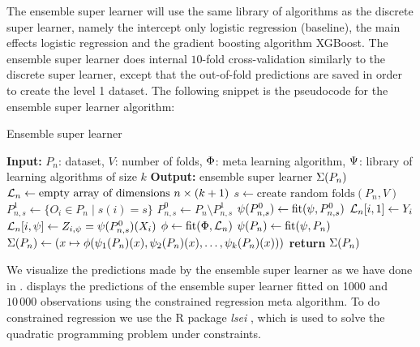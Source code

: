 \documentclass[./main.tex]{subfiles}
\begin{document}
The ensemble super learner will use the same library of algorithms as the discrete super learner, namely the intercept only logistic regression (baseline), the main effects logistic regression and the gradient boosting algorithm XGBoost. The ensemble super learner does internal $ 10 $-fold cross-validation similarly to the discrete super learner, except that the out-of-fold predictions are saved in order to create the level 1 dataset. The following snippet is the pseudocode for the ensemble super learner algorithm:
\begin{algorithm}[H]
\caption{Ensemble super learner}
\begin{algorithmic}[1]
\State \textbf{Input:} $P_n$: dataset, $V$: number of folds, $ \Phi $: meta learning algorithm, $ \Psi $: library of learning algorithms of size $ k $
\State \textbf{Output:} ensemble super learner $ \Sigma(P_n) $
\State $\mathcal{L}_n \gets \text{empty array of dimensions } n \times (k+1)$  
\State $s \gets \text{create random folds}(P_n, V)$ 
    \State $P_{n, s}^{1} \gets \{O_i \in P_n \mid s(i) = s\} $
    \State $P_{n, s}^{0} \gets P_n \setminus P_{n,s}^{1} $
    \For{$\la \in \lib$}
        \State $ \psi(P_{n,s}^{0}) \gets \text{fit}(\psi, P_{n, s}^{0})$
            \State $ \mathcal{L}_n[i, 1] \gets Y_i $ 
            \State $ \mathcal{L}_n[i, \psi] \gets Z_{i, \psi} = \psi(P_{n,s}^{0})(X_i) $ 
        \EndFor
    \EndFor
\EndFor
\State $ \phi \gets \text{fit}(\Phi, \mathcal{L}_n) $ 
\For{$\la \in \lib$}
    \State $ \psi(P_{n}) \gets \text{fit}(\psi, P_{n})$ 
\EndFor
\State $ \Sigma(P_n) \gets (x \mapsto \phi(\psi_1(P_n)(x), \psi_2(P_n)(x), \dots , \psi_{k}(P_n)(x))) $ 
\State \textbf{return} $ \Sigma(P_n) $
\end{algorithmic}
\end{algorithm}
We visualize the predictions made by the ensemble super learner as we have done in .  displays the predictions of the ensemble super learner fitted on 1000 and $ 10\,000 $ observations using the constrained regression meta algorithm. To do constrained regression we use the R package \textit{lsei} \parencite{lsei}, which is used to solve the quadratic programming problem under constraints.  
\end{document}
